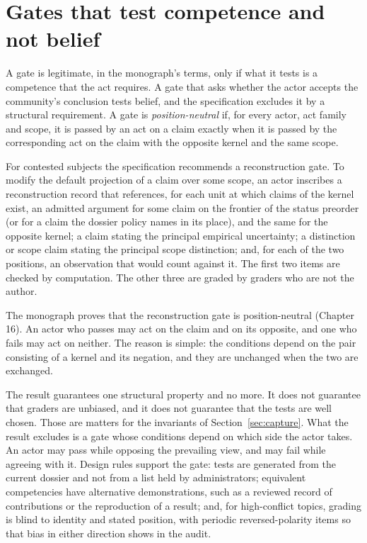 \documentclass[11pt]{article}
\begin{document}
\section{Gates that test competence and not belief}\label{sec:symmetric}

A gate is legitimate, in the monograph's terms, only if what it tests is a competence that the act requires. A gate that asks whether the actor accepts the community's conclusion tests belief, and the specification excludes it by a structural requirement. A gate is \emph{position-neutral} if, for every actor, act family and scope, it is passed by an act on a claim exactly when it is passed by the corresponding act on the claim with the opposite kernel and the same scope.

For contested subjects the specification recommends a reconstruction gate. To modify the default projection of a claim over some scope, an actor inscribes a reconstruction record that references, for each unit at which claims of the kernel exist, an admitted argument for some claim on the frontier of the status preorder (or for a claim the dossier policy names in its place), and the same for the opposite kernel; a claim stating the principal empirical uncertainty; a distinction or scope claim stating the principal scope distinction; and, for each of the two positions, an observation that would count against it. The first two items are checked by computation. The other three are graded by graders who are not the author.

The monograph proves that the reconstruction gate is position-neutral (Chapter 16). An actor who passes may act on the claim and on its opposite, and one who fails may act on neither. The reason is simple: the conditions depend on the pair consisting of a kernel and its negation, and they are unchanged when the two are exchanged.

The result guarantees one structural property and no more. It does not guarantee that graders are unbiased, and it does not guarantee that the tests are well chosen. Those are matters for the invariants of Section~\ref{sec:capture}. What the result excludes is a gate whose conditions depend on which side the actor takes. An actor may pass while opposing the prevailing view, and may fail while agreeing with it. Design rules support the gate: tests are generated from the current dossier and not from a list held by administrators; equivalent competencies have alternative demonstrations, such as a reviewed record of contributions or the reproduction of a result; and, for high-conflict topics, grading is blind to identity and stated position, with periodic reversed-polarity items so that bias in either direction shows in the audit.
\end{document}
